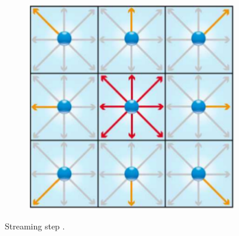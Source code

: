 \begin{figure}[H]
\begin{subfigure}[h]{0.3\textwidth}
    \includegraphics[width=\textwidth]{img/fig7-2.png}
  \end{subfigure}
  \caption{Streaming step \cite{pflaum}.}\label{fig:D2Q9-streaming}
\end{figure}

